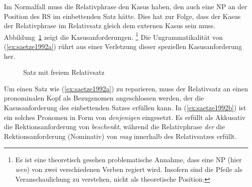 \Np

\begin{exe}
  \ex\label{ex:saetze1991}
  \begin{xlist}
  \end{xlist}
\end{exe}


Im Normalfall muss die Relativphrase den Kasus haben, den auch eine NP an der Position des RS im einbettenden Satz hätte.
Dies hat zur Folge, dass der Kasus der Relativphrase im Relativsatz gleich dem externen Kasus sein muss.
Abbildung~\ref{fig:saetze1991b} zeigt die Kasusanforderungen.%
\footnote{Es ist eine theoretisch gesehen problematische Annahme, dass eine NP (hier \textit{wen}) von zwei verschiedenen Verben regiert wird.
Insofern sind die Pfeile als Veranschaulichung zu verstehen, nicht als theoretische Position.}
Die Ungrammatikalität von (\ref{ex:saetze1992a}) rührt aus einer Verletzung dieser speziellen Kasusanforderung her.

\begin{figure}[!htbp]
  \centering
  \caption{Satz mit freiem Relativsatz}
  \label{fig:saetze1991b}
\end{figure}

\begin{exe}
\end{exe}

Um einen Satz wie (\ref{ex:saetze1992a}) zu reparieren, muss der Relativsatz an einen pronominalen Kopf als Bezugsnomen angeschlossen werden, der die Kasusanforderung des einbettenden Satzes erfüllen kann.
In (\ref{ex:saetze1992b}) ist ein solches Pronomen in Form von \textit{denjenigen} eingesetzt.
Es erfüllt als Akkusativ die Rektionsanforderung von \textit{beschenkt}, während die Relativphrase \textit{der} die Rektionsanforderung (Nominativ) von \textit{mag} innerhalb des Relativsatzes erfüllt.

